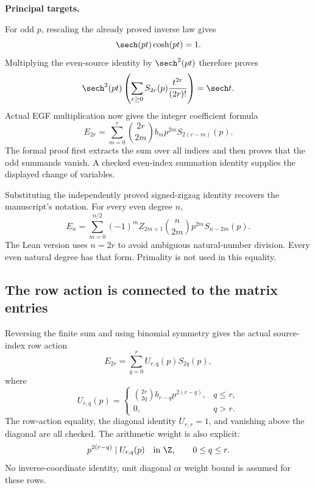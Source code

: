 \textbf{Principal targets.}\par
{}\par
{}
\par\medskip
{}
For odd $p$, rescaling the already proved inverse law gives
\[
 \sech(pt)\cosh(pt)=1.
\]
Multiplying the even-source identity by $\sech^2(pt)$ therefore proves
\[
 \sech^2(pt)\left(\sum_{r\ge0}S_{2r}(p)\frac{t^{2r}}{(2r)!}\right)=\sech t.
\]
Actual EGF multiplication now gives the integer coefficient formula
\[
 \boxed{E_{2r}=\sum_{m=0}^{r}\binom{2r}{2m}b_m p^{2m}S_{2(r-m)}(p).}
\]
The formal proof first extracts the sum over all indices and then proves that the odd summands vanish. A checked even-index summation identity supplies the displayed change of variables.

Substituting the independently proved signed-zigzag identity recovers the manuscript's notation. For every even degree $n$,
\[
 \boxed{E_n=\sum_{m=0}^{n/2}(-1)^m Z_{2m+1}\binom n{2m}p^{2m}S_{n-2m}(p).}
\]
The Lean version uses $n=2r$ to avoid ambiguous natural-number division. Every even natural degree has that form. Primality is not used in this equality.

\subsection*{The row action is connected to the matrix entries}
Reversing the finite sum and using binomial symmetry gives the actual source-index row action
\[
 E_{2r}=\sum_{q=0}^{r}U_{r,q}(p)S_{2q}(p),
\]
where
\[
 U_{r,q}(p)=
 \begin{cases}
 \displaystyle\binom{2r}{2q}b_{r-q}p^{2(r-q)},&q\le r,\\
 0,&q>r.
 \end{cases}
\]
The row-action equality, the diagonal identity $U_{r,r}=1$, and vanishing above the diagonal are all checked. The arithmetic weight is also explicit:
\[
 p^{2(r-q)}\mid U_{r,q}(p)\quad\text{in }\Z,\qquad 0\le q\le r.
\]
No inverse-coordinate identity, unit diagonal or weight bound is assumed for these rows.

